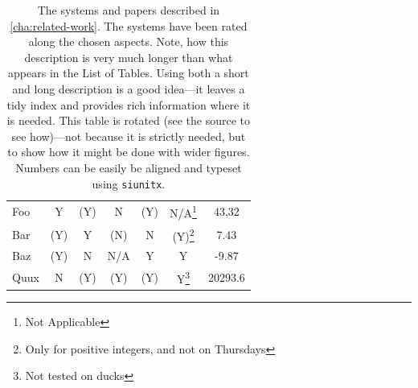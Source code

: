 \begin{landscape}
  \begin{table}[h]
    \centering
    \begin{minipage}{.5\linewidth}
      \renewcommand\thefootnote{\thempfootnote}
      \begin{tabularx}{1.11\linewidth}{XcccccS} \toprule
         &  &  &  &  &  &  \\ \midrule
        Foo  & Y    & (Y)  & N   & (Y) & N/A\footnote{Not Applicable}                                   & 43,32\\
        Bar  & (Y)  & Y    & (N) & N   & (Y)\footnote{Only for positive integers, and not on Thursdays} & 7.43\\
        Baz  & (Y)  & N    & N/A & Y   & Y                                                      & -9.87\\
        Quux & N    & (Y)  & (Y) & (Y) & Y\footnote{Not tested on ducks}                                & 20293.6\\
        \bottomrule
      \end{tabularx}
      \caption[Summary of systems]{The systems and papers described in \autoref{cha:related-work}. The systems have been rated along the chosen aspects. Note, how this description is very much longer than what appears in the List of Tables. Using both a short and long description is a good idea---it leaves a tidy index and provides rich information where it is needed. This table is rotated (see the source to see how)---not because it is strictly needed, but to show how it might be done with wider figures. Numbers can be easily be aligned and typeset using \texttt{siunitx}.}
      \label{tab:relatedwork-summary}
    \end{minipage}
  \end{table}
\end{landscape}


